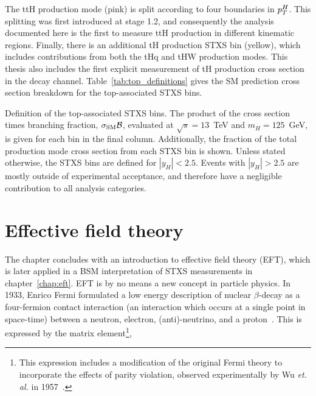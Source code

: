 The ttH production mode (pink) is split according to four boundaries in $p_T^H$. This splitting was first introduced at stage 1.2, and consequently the \Hgg analysis documented here is the first to measure ttH production in different kinematic regions. Finally, there is an additional tH production STXS bin (yellow), which includes contributions from both the tHq and tHW production modes. This thesis also includes the first explicit measurement of tH production cross section in the \Hgg decay channel. Table~\ref{tab:top_definitions} gives the SM prediction cross section breakdown for the top-associated STXS bins.


\begin{table}[htb!]
    \caption[Top-associated STXS bin definitions]{Definition of the top-associated STXS bins. The product of the cross section times \Hgg branching fraction, $\sigma_{\rm{SM}}\mathcal{B}$, evaluated at $\sqrt{s}=13$~TeV and $m_H=125$~GeV, is given for each bin in the final column. Additionally, the fraction of the total production mode cross section from each STXS bin is shown. Unless stated otherwise, the STXS bins are defined for $|y_H|<2.5$. Events with $|y_H|>2.5$ are mostly outside of experimental acceptance, and therefore have a negligible contribution to all analysis categories.}
    \label{tab:top_definitions}
    \centering
    \scriptsize
    \renewcommand{\arraystretch}{1.5}
    \setlength{\tabcolsep}{5pt}
    
\end{table}

\FloatBarrier

\section{Effective field theory}\label{sec:theory_eft}
The chapter concludes with an introduction to effective field theory (EFT), which is later applied in a BSM interpretation of STXS measurements in chapter~\ref{chap:eft}. EFT is by no means a new concept in particle physics. In 1933, Enrico Fermi formulated a low energy description of nuclear $\beta$-decay as a four-fermion contact interaction (an interaction which occurs at a single point in space-time) between a neutron, electron, (anti)-neutrino, and a proton~\cite{Fermi:1933jpa}. This is expressed by the matrix element\footnote{This expression includes a modification of the original Fermi theory to incorporate the effects of parity violation, observed experimentally by Wu \textit{et. al.} in 1957~\cite{PhysRev.105.1413}.},

